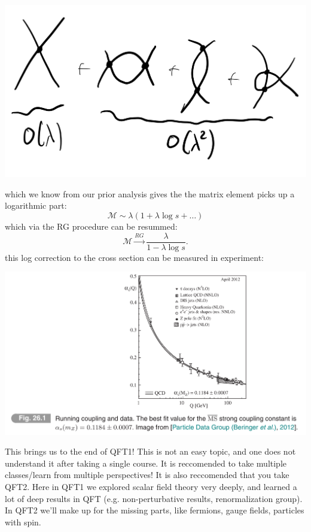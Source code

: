 \begin{center}
    \includegraphics[scale=0.3]{Lectures/Figures/lec18-Olambdasquared.png}
\end{center}

which we know from our prior analysis gives the the matrix element picks up a logarithmic part:
\begin{equation}
    \mathcal{M} \sim \lambda(1 + \lambda \log s + \ldots)
\end{equation}
which via the RG procedure can be resummed:
\begin{equation}
    \mathcal{M} \stackrel{RG}{\to} \frac{\lambda}{1 - \lambda \log s}.
\end{equation}
this log correction to the cross section can be measured in experiment:

\begin{center}
    \includegraphics[scale=0.3]{Lectures/Figures/logruncouplings.png}
\end{center}

This brings us to the end of QFT1! This is not an easy topic, and one does not understand it after taking a single course. It is reccomended to take multiple classes/learn from multiple perspectives! It is also reccomended that you take QFT2. Here in QFT1 we explored scalar field theory very deeply, and learned a lot of deep results in QFT (e.g. non-perturbative results, renormalization group). In QFT2 we'll make up for the missing parts, like fermions, gauge fields, particles with spin.